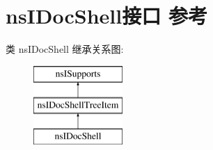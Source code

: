 \hypertarget{interfacens_i_doc_shell}{}\section{ns\+I\+Doc\+Shell接口 参考}
\label{interfacens_i_doc_shell}
类 ns\+I\+Doc\+Shell 继承关系图\+:\begin{figure}[H]
\begin{center}
\leavevmode
\includegraphics[height=3.000000cm]{interfacens_i_doc_shell}
\end{center}
\end{figure}
